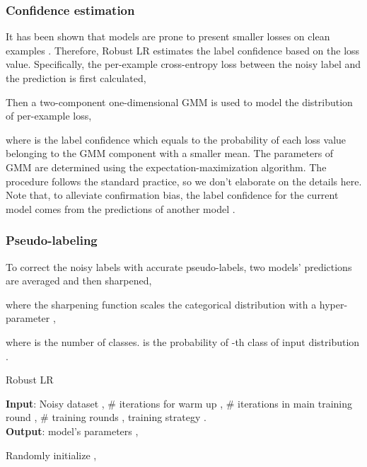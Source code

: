 \documentclass[letterpaper]{article} \usepackage{aaai23}  \usepackage{times}  \usepackage{helvet}  \usepackage{courier}  \usepackage[hyphens]{url}  \usepackage{graphicx} \urlstyle{rm} \def\UrlFont{\rm}  \usepackage{natbib}  \usepackage{caption} \frenchspacing  \setlength{\pdfpagewidth}{8.5in} \setlength{\pdfpageheight}{11in} \usepackage{algorithm}
\begin{document}
\subsubsection{Confidence estimation}
It has been shown that models are prone to present smaller losses on clean examples \cite{arpit2017closer,chen2019understanding,han2018co,li2020dividemix}.
Therefore, Robust LR estimates the label confidence based on the loss value.
Specifically, the per-example cross-entropy loss  between the noisy label and the prediction is first calculated,

Then a two-component one-dimensional GMM is used to model the distribution of per-example loss,

where  is the label confidence which equals to the probability of each loss value belonging to the GMM component with a smaller mean.
The parameters of GMM are determined using the expectation-maximization algorithm. 
The procedure follows the standard practice,  so we don't elaborate on the details here.
Note that, to alleviate confirmation bias, the label confidence for the current model  comes from the predictions of another model . 

\subsubsection{Pseudo-labeling}
To correct the noisy labels with accurate pseudo-labels, two models' predictions are averaged and then sharpened,

where the sharpening function scales the categorical distribution with a hyper-parameter ,

where  is the number of classes.  is the probability of -th class of input distribution .

\begin{algorithm}
    \caption{Robust LR} 
    \label{alg}
    \textbf{Input}:
    Noisy dataset ,
    \# iterations for warm up , 
    \# iterations in main training round , 
    \# training rounds , 
    training strategy .
    \\
    \textbf{Output}: model's parameters ,  
    \begin{algorithmic}[1] 
    \State Randomly initialize , 
    \State 
    
                \State 
                \State {}
            \EndFor
            \State 
                \State 
                \State {}
                \State  {}
            \EndFor
            \State 
        \EndFor
    \EndFor

    \end{algorithmic} 
\end{algorithm}
\end{document}
